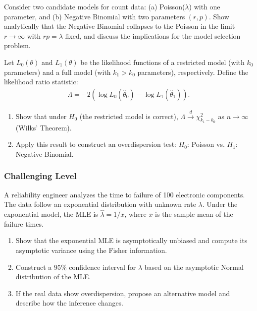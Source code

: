 \begin{problema}
	\label{prob:3.10.7}
	Consider two candidate models for count data: (a) Poisson($\lambda$) with one parameter, and (b) Negative Binomial with two parameters $(r, p)$. Show analytically that the Negative Binomial collapses to the Poisson in the limit $r \to \infty$ with $rp = \lambda$ fixed, and discuss the implications for the model selection problem.
\end{problema}

\begin{problema}
	\label{prob:3.10.8}
	Let $L_{0}(\theta)$ and $L_{1}(\theta)$ be the likelihood functions of a restricted model (with $k_{0}$ parameters) and a full model (with $k_{1} > k_{0}$ parameters), respectively. Define the likelihood ratio statistic:
	\begin{align*}
		\Lambda = -2(\log L_{0}(\hat{\theta}_{0}) - \log L_{1}(\hat{\theta}_{1})).
	\end{align*}
	\begin{enumerate}
		\item Show that under $H_{0}$ (the restricted model is correct), $\Lambda \xrightarrow{d} \chi^{2}_{k_{1} - k_{0}}$ as $n \to \infty$ (Wilks' Theorem).
		\item Apply this result to construct an overdispersion test: $H_{0}$: Poisson vs. $H_{1}$: Negative Binomial.
	\end{enumerate}
\end{problema}

\subsubsection*{Challenging Level}

\begin{problema}
	\label{prob:3.10.9}
	A reliability engineer analyzes the time to failure of 100 electronic components. The data follow an exponential distribution with unknown rate $\lambda$. Under the exponential model, the MLE is $\hat{\lambda} = 1/\bar{x}$, where $\bar{x}$ is the sample mean of the failure times.
	\begin{enumerate}
		\item Show that the exponential MLE is asymptotically unbiased and compute its asymptotic variance using the Fisher information.
		\item Construct a $95\%$ confidence interval for $\lambda$ based on the asymptotic Normal distribution of the MLE.
		\item If the real data show overdispersion, propose an alternative model and describe how the inference changes.
	\end{enumerate}
\end{problema}

